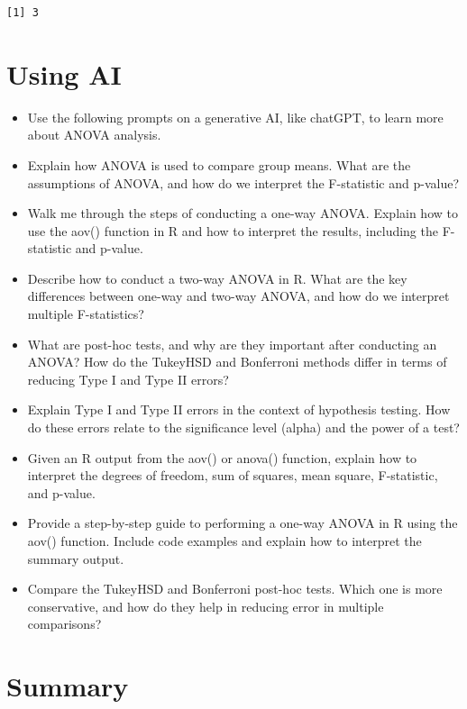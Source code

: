 \documentclass[
  letterpaper,
  DIV=11,
  numbers=noendperiod]{scrreprt}
\begin{document}
\begin{verbatim}
[1] 3
\end{verbatim}


\chapter{Using AI}\label{using-ai-5}

\begin{itemize}
\item
  Use the following prompts on a generative AI, like chatGPT, to learn
  more about ANOVA analysis.
\item
  Explain how ANOVA is used to compare group means. What are the
  assumptions of ANOVA, and how do we interpret the F-statistic and
  p-value?
\item
  Walk me through the steps of conducting a one-way ANOVA. Explain how
  to use the aov() function in R and how to interpret the results,
  including the F-statistic and p-value.
\item
  Describe how to conduct a two-way ANOVA in R. What are the key
  differences between one-way and two-way ANOVA, and how do we interpret
  multiple F-statistics?
\item
  What are post-hoc tests, and why are they important after conducting
  an ANOVA? How do the TukeyHSD and Bonferroni methods differ in terms
  of reducing Type I and Type II errors?
\item
  Explain Type I and Type II errors in the context of hypothesis
  testing. How do these errors relate to the significance level (alpha)
  and the power of a test?
\item
  Given an R output from the aov() or anova() function, explain how to
  interpret the degrees of freedom, sum of squares, mean square,
  F-statistic, and p-value.
\item
  Provide a step-by-step guide to performing a one-way ANOVA in R using
  the aov() function. Include code examples and explain how to interpret
  the summary output.
\item
  Compare the TukeyHSD and Bonferroni post-hoc tests. Which one is more
  conservative, and how do they help in reducing error in multiple
  comparisons?
\end{itemize}


\chapter{Summary}\label{summary-6}
\end{document}
